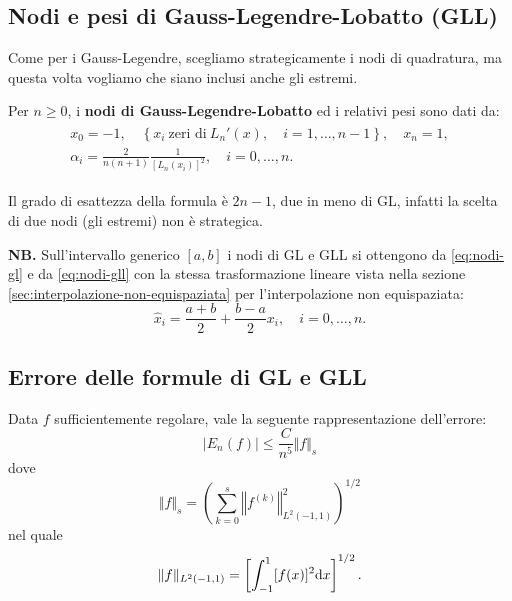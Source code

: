 \subsection{Nodi e pesi di Gauss-Legendre-Lobatto (GLL)}
Come per i Gauss-Legendre, scegliamo strategicamente i nodi di quadratura, ma questa volta vogliamo che siano inclusi anche gli estremi.

Per $n\geqslant 0$, i \textbf{nodi di Gauss-Legendre-Lobatto} ed i relativi pesi sono dati da:
\begin{gather}
\begin{split}
x_{0} =-1,\quad \left\{x_{i} \ \text{zeri di} \ L_{n} '(x) ,\quad i=1,\dotsc ,n-1\right\} ,\quad x_{n} =1,\\
\alpha _{i} =\frac{2}{n( n+1)}\frac{1}{[ L_{n}( x_{i})]^{2}} ,\quad i=0,\dotsc ,n.
\end{split}
\label{eq:nodi-gll}
\end{gather}

Il grado di esattezza della formula è $2n-1$, due in meno di GL, infatti la scelta di due nodi (gli estremi) non è strategica.

\textbf{NB.}
Sull'intervallo generico $[ a,b]$ i nodi di GL e GLL si ottengono da \eqref{eq:nodi-gl} e da \eqref{eq:nodi-gll} con la stessa trasformazione lineare vista nella sezione \ref{sec:interpolazione-non-equispaziata} per l'interpolazione non equispaziata:
\begin{equation*}
\hat{x}_{i} =\frac{a+b}{2} +\frac{b-a}{2} x_{i}, \quad i=0,\dotsc ,n.
\end{equation*}

\subsection{Errore delle formule di GL e GLL}
Data $f$ sufficientemente regolare, vale la seguente rappresentazione dell'errore:
\begin{equation*}
| E_{n}(f)| \leqslant \frac{C}{n^{5}}\Vert f\Vert _{s}
\end{equation*}
dove
\begin{equation*}
\Vert f\Vert _{s} =\left(\sum\limits ^{s}_{k=0}\left\Vert f^{(k)}\right\Vert ^{2}_{L^{2}( -1,1)}\right)^{1/2}
\end{equation*}
nel quale
\begin{equation*}
\Vert f\Vert _{L^{2}( -1,1)} =\left[\int\nolimits ^{1}_{-1}[ f(x)]^{2} \mathrm d x\right]^{1/2} .
\end{equation*}

